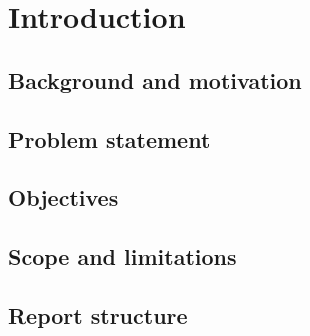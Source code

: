 \section{Introduction}


\subsection{Background and motivation}




\subsection{Problem statement}




\subsection{Objectives}




\subsection{Scope and limitations}




\subsection{Report structure}











